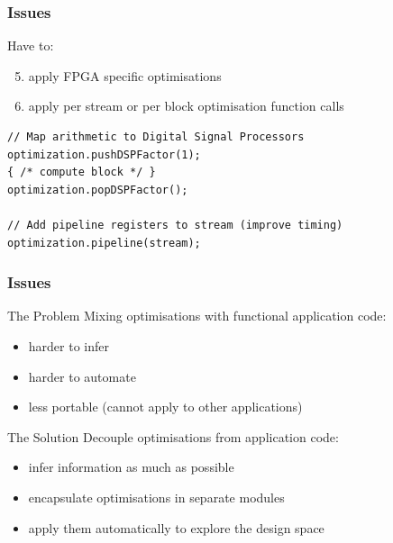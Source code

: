 \begin{frame}[fragile]
  \frametitle{Issues}
  Have to:
  \begin{enumerate}
    \setcounter{enumi}{4}
      \item apply FPGA specific optimisations
      \item apply per stream or per block optimisation function calls
      \end{enumerate}
    \begin{lstlisting}
// Map arithmetic to Digital Signal Processors
optimization.pushDSPFactor(1);
{ /* compute block */ }
optimization.popDSPFactor();

// Add pipeline registers to stream (improve timing)
optimization.pipeline(stream);

    \end{lstlisting}
\end{frame}

\begin{frame}[fragile]
  \frametitle{Issues}
    \begin{beamerboxesrounded}{The Problem}
      Mixing optimisations with functional application code:
      \begin{itemize}
        \item harder to infer
        \item harder to automate
        \item less portable (cannot apply to other applications)
      \end{itemize}
    \end{beamerboxesrounded}
    \begin{beamerboxesrounded}{The Solution}
      Decouple optimisations from application code:
    \begin{itemize}
    \item infer information as much as possible
    \item encapsulate optimisations in separate modules
    \item apply them automatically to explore the design space
    \end{itemize}
    \end{beamerboxesrounded}
\end{frame}
